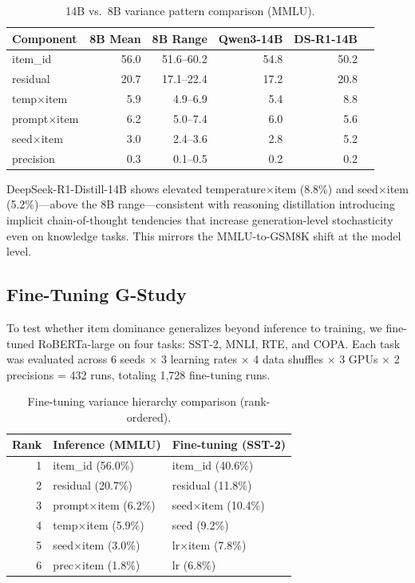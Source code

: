 \documentclass[11pt]{article}
\begin{document}
\begin{table}[t]
\centering
\caption{14B vs.\ 8B variance pattern comparison (MMLU).}
\label{tab:14b}
\small
\begin{tabular}{lrrrrr}
\toprule
Component & 8B Mean & 8B Range & Qwen3-14B & DS-R1-14B \\
\midrule
item\_id & 56.0 & 51.6--60.2 & 54.8 & 50.2 \\
residual & 20.7 & 17.1--22.4 & 17.2 & 20.8 \\
temp$\times$item & 5.9 & 4.9--6.9 & 5.4 & 8.8 \\
prompt$\times$item & 6.2 & 5.0--7.4 & 6.0 & 5.6 \\
seed$\times$item & 3.0 & 2.4--3.6 & 2.8 & 5.2 \\
precision & 0.3 & 0.1--0.5 & 0.2 & 0.2 \\
\bottomrule
\end{tabular}
\end{table}

DeepSeek-R1-Distill-14B shows elevated temperature$\times$item (8.8\%) and seed$\times$item (5.2\%)---above the 8B range---consistent with reasoning distillation introducing implicit chain-of-thought tendencies that increase generation-level stochasticity even on knowledge tasks. This mirrors the MMLU-to-GSM8K shift at the model level.

\subsection{Fine-Tuning G-Study}
\label{sec:finetuning}

To test whether item dominance generalizes beyond inference to training, we fine-tuned RoBERTa-large on four tasks: SST-2, MNLI, RTE, and COPA. Each task was evaluated across 6 seeds $\times$ 3 learning rates $\times$ 4 data shuffles $\times$ 3 GPUs $\times$ 2 precisions = 432 runs, totaling 1{,}728 fine-tuning runs.

\begin{table}[t]
\centering
\caption{Fine-tuning variance hierarchy comparison (rank-ordered).}
\label{tab:finetune_compare}
\small
\begin{tabular}{rll}
\toprule
Rank & Inference (MMLU) & Fine-tuning (SST-2) \\
\midrule
1 & item\_id (56.0\%) & item\_id (40.6\%) \\
2 & residual (20.7\%) & residual (11.8\%) \\
3 & prompt$\times$item (6.2\%) & seed$\times$item (10.4\%) \\
4 & temp$\times$item (5.9\%) & seed (9.2\%) \\
5 & seed$\times$item (3.0\%) & lr$\times$item (7.8\%) \\
6 & prec$\times$item (1.8\%) & lr (6.8\%) \\
\bottomrule
\end{tabular}
\end{table}
\end{document}

